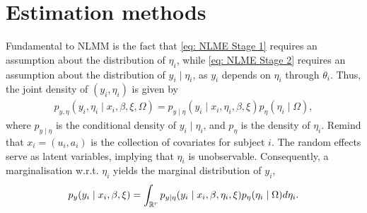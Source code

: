 \section{Estimation methods} \label{sec: Estimation methods}

Fundamental to NLMM is the fact that \eqref{eq: NLME Stage 1} requires an assumption about the distribution of $\eta_i$, while \eqref{eq: NLME Stage 2} requires an assumption about the distribution of $y_i \mid \eta_i$, as $y_i$ depends on $\eta_i$ through $\theta_i$. Thus, the joint density of $(y_i, \eta_i)$ is given by
\begin{align*}
    p_{y,\eta}(y_i,\eta_i\mid x_i,\beta,\xi,\Omega)=p_{y\mid \eta}(y_i\mid x_i,\eta_i,\beta,\xi)p_\eta(\eta_i\mid \Omega),
\end{align*}
where $p_{y\mid  \eta}$ is the conditional density of $y_i \mid \eta_i$, and $p_\eta$ is the density of $\eta_i$. Remind that $x_i =(u_i,a_i)$ is the collection of covariates for subject $i$. The random effects serve as latent variables, implying that $\eta_i$ is unobservable. Consequently, a marginalisation w.r.t. $\eta_i$ yields the marginal distribution of $y_i$,
\begin{align}
    p_y(y_i\mid x_i,\beta,\xi)=\int_{\mathbb{R}^r} p_{y\mid \eta}(y_i\mid x_i,\beta,\eta_i,\xi)p_\eta(\eta_i\mid  \Omega)d\eta_i. \label{eq: marginal distribution of y_i}
\end{align}

